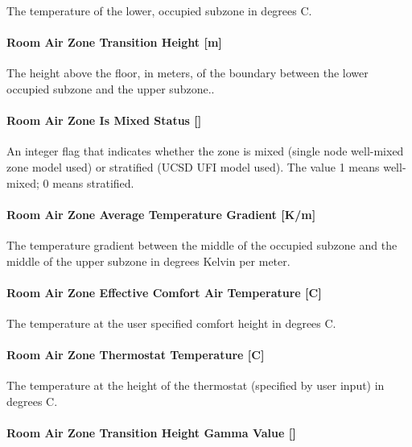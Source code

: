 The temperature of the lower, occupied subzone in degrees C.

\paragraph{Room Air Zone Transition Height {[}m{]}}\label{room-air-zone-transition-height-m-1}

The height above the floor, in meters, of the boundary between the lower occupied subzone and the upper subzone..

\paragraph{\texorpdfstring{Room Air Zone Is Mixed Status {[]}}{Room Air Zone Is Mixed Status }}\label{room-air-zone-is-mixed-status-1}

An integer flag that indicates whether the zone is mixed (single node well-mixed zone model used) or stratified (UCSD UFI model used). The value 1 means well-mixed; 0 means stratified.

\paragraph{Room Air Zone Average Temperature Gradient {[}K/m{]}}\label{room-air-zone-average-temperature-gradient-km-1}

The temperature gradient between the middle of the occupied subzone and the middle of the upper subzone in degrees Kelvin per meter.

\paragraph{Room Air Zone Effective Comfort Air Temperature {[}C{]}}\label{room-air-zone-effective-comfort-air-temperature-c}

The temperature at the user specified comfort height in degrees C.

\paragraph{Room Air Zone Thermostat Temperature {[}C{]}}\label{room-air-zone-thermostat-temperature-c-1}

The temperature at the height of the thermostat (specified by user input) in degrees C.

\paragraph{\texorpdfstring{Room Air Zone Transition Height Gamma Value {[]}}{Room Air Zone Transition Height Gamma Value }}\label{room-air-zone-transition-height-gamma-value}

